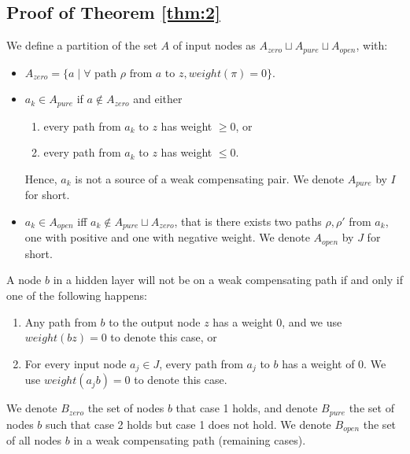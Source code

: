 			
			\subsection{Proof of Theorem \ref{thm:2}}
			
			\begin{definition}
				We define a partition of the set $A$ of input nodes as $A_{zero} \sqcup A_{pure}\sqcup A_{open}$, with:  
				\begin{itemize}
					\item $A_{zero}= \{a \mid \forall \text{ path $\rho$ from $a$ to } z, weight(\pi)=0\}$.
	
					\item $a_k \in A_{pure}$  if $a \notin A_{zero}$ and either
					\begin{enumerate}
						\item every path from $a_k$ to $z$ has weight $\geq 0$, or
						\item every path from $a_k$ to $z$ has weight $\leq 0$. 
						
					\end{enumerate}
					Hence, $a_k$ is not a source of a weak compensating pair. We denote 
					$A_{pure}$ by $I$ for short.
					\item $a_k \in A_{open}$ iff $a_k \notin A_{pure} \sqcup A_{zero}$, that is there exists two paths $\rho,\rho'$ from $a_k$, one with positive and one with negative weight. 	We denote $A_{open}$ by $J$ for short.
				\end{itemize}
			\end{definition} 
			
			
			
			\begin{lemma} \label{lem:open_node_2}
				A node $b$ in a hidden layer will not be on a weak compensating path if and only if one of the following happens:
				\begin{enumerate}
					\item Any path from $b$ to the output node $z$ has a weight $0$, and we use $weight({bz})=0$ to denote this case, or
					\item For every input node $a_j\in J$, every path from $a_j$ to $b$ has a weight of $0$. We use $weight({a_jb})=0$ to denote this case.
				\end{enumerate}
				
			\end{lemma}
			
			We denote $B_{zero}$ the set of nodes $b$ that case 1 holds, and denote $B_{pure}$ the set of nodes $b$ such that case 2 holds but case 1 does not hold.
			We denote $B_{open}$ the set of all nodes $b$ in a weak compensating path (remaining cases).
			
